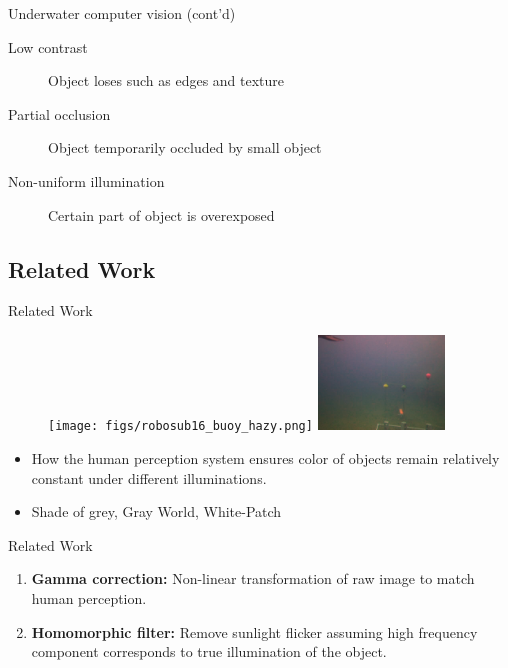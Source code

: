 \documentclass{beamer}
\begin{document}
\begin{frame}{Underwater computer vision (cont'd)}
    \begin{description}
        \item[Low contrast] Object loses such as edges and texture
        \item[Partial occlusion] Object temporarily occluded by small object
        \item[Non-uniform illumination] Certain part of object is overexposed
    \end{description}
\end{frame}

\subsection{Related Work}
\begin{frame}{Related Work}
    \begin{figure}
        \centering
        \texttt{[image: figs/robosub16\_buoy\_hazy.png]}\hspace{5em}
        \includegraphics[width=0.3\textwidth, height=0.3\textheight]{figs/robosub16_buoy_hazy_shadegrey.png}
    \end{figure}
    \begin{itemize}
        \item How the human perception system ensures color of objects remain relatively constant under different illuminations.
        \item Shade of grey, Gray World, White-Patch
    \end{itemize}
\end{frame}

\begin{frame}{Related Work}
    \begin{enumerate}
        \item \textbf{Gamma correction:} Non-linear transformation of raw image to match human perception.
        \item \textbf{Homomorphic filter:} Remove sunlight flicker assuming high frequency component corresponds to true illumination of the object.
    \end{enumerate}
\end{frame}
\end{document}
